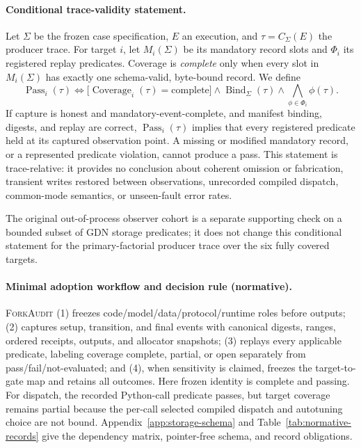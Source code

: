\documentclass{article}
\newcommand{\method}{\textsc{ForkAudit}}
\begin{document}
\paragraph{Conditional trace-validity statement.}
Let $\Sigma$ be the frozen case specification, $E$ an execution, and
$\tau=C_{\Sigma}(E)$ the producer trace.  For target $i$, let
$M_i(\Sigma)$ be its mandatory record slots and $\Phi_i$ its registered replay
predicates.  Coverage is \emph{complete} only when every slot in
$M_i(\Sigma)$ has exactly one schema-valid, byte-bound record.  We define
\begin{equation}
  \operatorname{Pass}_i(\tau) \Longleftrightarrow
  \bigl[\operatorname{Coverage}_i(\tau)=\mathrm{complete}\bigr]
  \wedge \operatorname{Bind}_{\Sigma}(\tau)
  \wedge \bigwedge_{\phi\in\Phi_i}\phi(\tau).
\end{equation}
If capture is honest and mandatory-event-complete, and manifest binding,
digests, and replay are correct, $\operatorname{Pass}_i(\tau)$ implies that
every registered predicate held at its captured observation point.  A missing
or modified mandatory record, or a represented predicate violation, cannot
produce a pass.  This statement is trace-relative: it provides no conclusion
about coherent omission or fabrication, transient writes restored between
observations, unrecorded compiled dispatch, common-mode semantics, or
unseen-fault error rates.

The original out-of-process observer cohort is a separate supporting check on a
bounded subset of GDN storage predicates; it does not change this conditional
statement for the primary-factorial producer trace over the six fully covered
targets.

\paragraph{Minimal adoption workflow and decision rule (normative).}
\method{} (1) freezes code/model/data/protocol/runtime roles before outputs;
(2) captures setup, transition, and final events with canonical digests,
ranges, ordered receipts, outputs, and allocator snapshots; (3) replays every
applicable predicate, labeling coverage complete, partial, or open separately
from pass/fail/not-evaluated; and (4), when sensitivity is claimed, freezes the
target-to-gate map and retains all outcomes.  Here frozen identity is complete
and passing.  For dispatch, the recorded Python-call predicate passes, but
target coverage remains partial because the per-call selected compiled dispatch
and autotuning choice are not bound.
Appendix~\ref{app:storage-schema} and Table~\ref{tab:normative-records} give the
dependency matrix, pointer-free schema, and record obligations.
\end{document}
